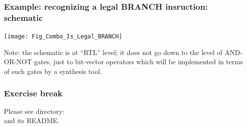 
\begin{frame}[fragile]
\frametitle{Example: recognizing a legal BRANCH insruction: schematic}

\footnotesize

\begin{center}
 \texttt{[image: Fig\_Combo\_Is\_Legal\_BRANCH]}
\end{center}

\vfill

Note: the schematic is at ``RTL'' level; it does not go down to the
level of AND-OR-NOT gates, just to bit-vector operators which will be
implemented in terms of such gates by a synthesis tool.

\end{frame}


\begin{frame}[fragile]
\frametitle{\EmojiExercise \hmm Exercise break}

Please see directory:  \\
and its README.

\end{frame}


